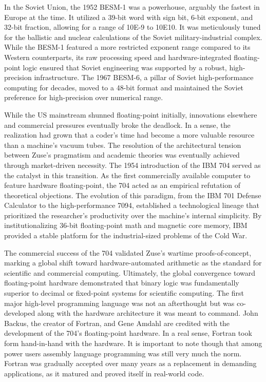 In the Soviet Union, the 1952 BESM-1 was a powerhouse, arguably the fastest in Europe at the time. It utilized a 39-bit word with sign bit, 6-bit exponent, and 32-bit fraction, allowing for a range of 10E-9 to 10E10. It was meticulously tuned for the ballistic and nuclear calculations of the Soviet military-industrial complex. While the BESM-1 featured a more restricted exponent range compared to its Western counterparts, its raw processing speed and hardware-integrated floating-point logic ensured that Soviet engineering was supported by a robust, high-precision infrastructure. The 1967 BESM-6, a pillar of Soviet high-performance computing for decades, moved to a 48-bit format and maintained the Soviet preference for high-precision over numerical range. 

While the US mainstream shunned floating-point initially, innovations elsewhere and commercial pressures eventually broke the deadlock. In a sense, the realization had grown that a coder’s time had become a more valuable resource than a machine’s vacuum tubes. The resolution of the architectural tension between Zuse’s pragmatism and academic theories was eventually achieved through market-driven necessity. The 1954 introduction of the IBM 704 served as the catalyst in this transition. As the first commercially available computer to feature hardware floating-point, the 704 acted as an empirical refutation of theoretical objections. The evolution of this paradigm, from the IBM 701 Defense Calculator to the high-performance 7094, established a technological lineage that prioritized the researcher's productivity over the machine's internal simplicity. By institutionalizing 36-bit floating-point math and magnetic core memory, IBM provided a stable platform for the industrial-sized problems of the Cold War. 

The commercial success of the 704 validated Zuse’s wartime proofs-of-concept, marking a global shift toward hardware-automated arithmetic as the standard for scientific and commercial computing. Ultimately, the global convergence toward floating-point hardware demonstrated that binary logic was fundamentally superior to decimal or fixed-point systems for scientific computing. The first major high-level programming language was not an afterthought but was co-developed along with the hardware architecture it was meant to command. John Backus, the creator of Fortran, and Gene Amdahl are credited with the development of the 704's floating-point hardware. In a real sense, Fortran took form hand-in-hand with the hardware. It is important to note though that among power users assembly language programming was still very much the norm. Fortran was gradually accepted over many years as a replacement in demanding applications, as it matured and proved itself in real-world code. 

